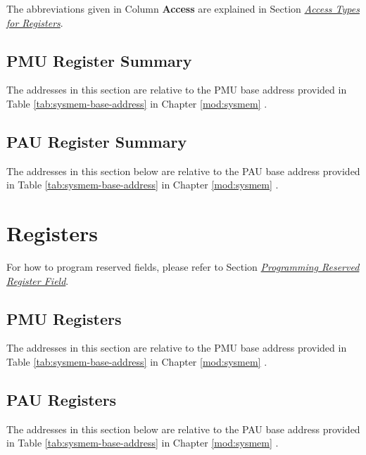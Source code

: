 \documentclass[main\_\_EN.tex]{subfiles}
\begin{document}
The abbreviations given in Column \textbf{Access} are explained in Section \hyperref[glossary-access-types]{\textit{Access Types for Registers}}.

\subsection{PMU Register Summary}
The addresses in this section are relative to the PMU base address provided in Table \ref{tab:sysmem-base-address} in Chapter \ref{mod:sysmem} \textit{}.




\subsection{PAU Register Summary}

The addresses in this section below are relative to the PAU base address provided in Table \ref{tab:sysmem-base-address} in Chapter \ref{mod:sysmem} \textit{}.




\newpage
\section{Registers}
For how to program reserved fields, please refer to Section \hyperref[programming-reserved-field]{\textit{Programming Reserved Register Field}}.

\subsection{PMU Registers}
The addresses in this section are relative to the PMU base address provided in Table \ref{tab:sysmem-base-address} in Chapter \ref{mod:sysmem} \textit{}.



\subsection{PAU Registers}
The addresses in this section below are relative to the PAU base address provided in Table \ref{tab:sysmem-base-address} in Chapter \ref{mod:sysmem} \textit{}.


\end{document}
